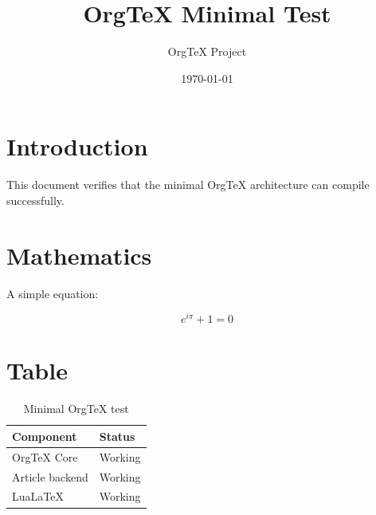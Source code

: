 \documentclass{orgtex-article}
\title{OrgTeX Minimal Test}
\author{OrgTeX Project}
\date{\today}
\begin{document}
\maketitle

\section{Introduction}

This document verifies that the minimal OrgTeX architecture can compile
successfully.

\section{Mathematics}

A simple equation:

\[
    e^{i\pi} + 1 = 0
\]

\section{Table}

\begin{table}[h]
    \centering
    \begin{tabular}{ll}
        \toprule
        Component & Status \\
        \midrule
        OrgTeX Core & Working \\
        Article backend & Working \\
        LuaLaTeX & Working \\
        \bottomrule
    \end{tabular}
    \caption{Minimal OrgTeX test}
\end{table}
\end{document}
